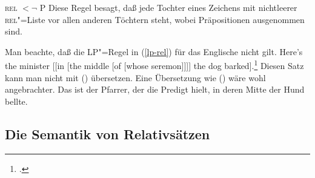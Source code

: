 
\ea
\label{lp-rel}
\textsc{rel}  $< \neg$ P
\z
Diese Regel besagt, daß jede Tochter eines Zeichens mit nichtleerer 
\textsc{rel}"=Liste vor allen anderen Töchtern steht, wobei Präpositionen ausgenommen sind. 

Man beachte, daß die LP"=Regel in (\ref{lp-rel}) für das
Englische nicht gilt.
\ea
Here's the minister [[in [the middle [of [whose seremon]]]] 
the dog barked].\footnote{ 
	.
}
\z
Diesen Satz kann man nicht mit () übersetzen.
\z
Eine Übersetzung wie () wäre wohl angebrachter.
\ea
Das ist der Pfarrer, der die Predigt hielt, in deren Mitte der Hund bellte.
\z
{}


\subsection{Die Semantik von Relativsätzen}
\label{sec-rs-sem-anal}

